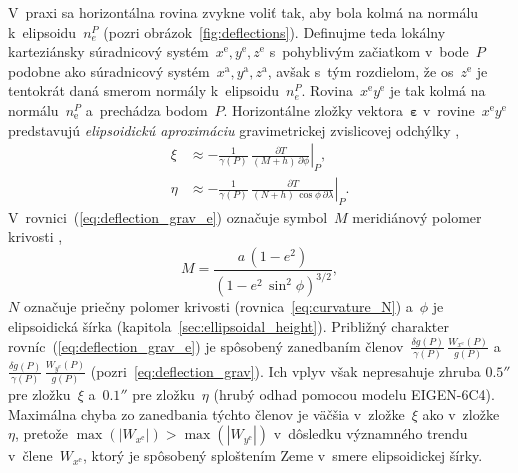 \documentclass[a4paper, 12pt]{book}
\begin{document}
V~praxi sa horizontálna rovina zvykne voliť tak, aby bola kolmá na normálu 
k~elipsoidu~$n_e^P$ (pozri obrázok~\ref{fig:deflections}).  Definujme teda 
lokálny karteziánsky súradnicový systém~$x^\mathrm{e}, y^\mathrm{e}, 
z^\mathrm{e}$ s~pohyblivým začiatkom v~bode~$P$ podobne ako súradnicový 
systém~$x^\mathrm{a}, y^\mathrm{a}, z^\mathrm{a}$, avšak s~tým rozdielom, že 
os~$z^\mathrm{e}$ je tentokrát daná smerom normály k~elipsoidu~$n_e^P$.  
Rovina~$x^\mathrm{e}y^{\mathrm{e}}$ je tak kolmá na normálu~$n^P_{\mathrm{e}}$ 
a~prechádza bodom~$P$.  Horizontálne zložky vektora~$\boldsymbol\varepsilon$ 
v~rovine~$x^\mathrm{e}y^\mathrm{e}$ predstavujú \emph{elipsoidickú aproximáciu} 
gravimetrickej zvislicovej odchýlky \parencite{Jekeli1999b},
%
\begin{equation}
\label{eq:deflection_grav_e}
\begin{split}
\xi &\approx -\frac{1}{\gamma(P)} \, \left.\frac{\partial T}{(M + h) \, 
\partial \phi}\right|_P{,}\\
%
\eta &\approx -\frac{1}{\gamma(P)} \, \left.\frac{\partial T}{(N + h) \, 
\cos\phi \, \partial \lambda}\right|_P{.}
\end{split}
\end{equation}
%
V~rovnici~(\ref{eq:deflection_grav_e}) označuje symbol~$M$ meridiánový polomer 
krivosti \parencite{TorgeGeodesy},
%
\begin{equation}
M = \frac{a \, (1 - e^2)}{\left(1 - e^2 \, \sin^2\phi \right)^{3 \slash 2}}{,}
\end{equation}
%
$N$ označuje priečny polomer krivosti (rovnica~\ref{eq:curvature_N}) a~$\phi$ 
je elipsoidická šírka (kapitola~\ref{sec:ellipsoidal_height}).  Približný 
charakter rovníc~(\ref{eq:deflection_grav_e}) je spôsobený zanedbaním 
členov~$\frac{\delta g(P)}{\gamma(P)} \, \frac{W_{x^\mathrm{e}}(P)}{g(P)}$ 
a~$\frac{\delta g(P)}{\gamma(P)} \, \frac{W_{y^\mathrm{e}}(P)}{g(P)}$ 
(pozri~\ref{eq:deflection_grav}).  Ich vplyv však nepresahuje zhruba $0.5''$ 
pre zložku~$\xi$ a~$0.1''$ pre zložku~$\eta$ (hrubý odhad pomocou modelu 
EIGEN-6C4).  Maximálna chyba zo zanedbania týchto členov je väčšia 
v~zložke~$\xi$ ako v~zložke~$\eta$, pretože $\max(|W_{x^\mathrm{e}}|) 
> \max(|W_{y^\mathrm{e}}|)$ v~dôsledku významného trendu 
v~člene~$W_{x^\mathrm{e}}$, ktorý je spôsobený sploštením Zeme v~smere 
elipsoidickej šírky.
\end{document}
